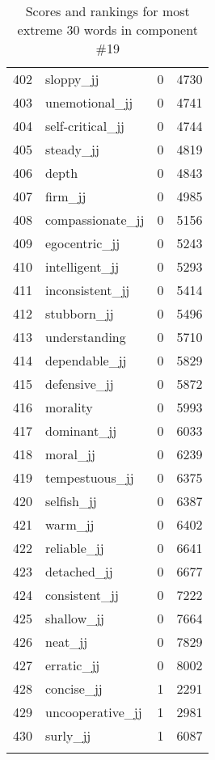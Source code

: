 \begin{longtable}[!htbp]{| rlr@{.}l |}
    402 & sloppy\_jj & 0 & 4730 \\
    403 & unemotional\_jj & 0 & 4741 \\
    404 & self-critical\_jj & 0 & 4744 \\
    405 & steady\_jj & 0 & 4819 \\
    406 & depth & 0 & 4843 \\
    407 & firm\_jj & 0 & 4985 \\
    408 & compassionate\_jj & 0 & 5156 \\
    409 & egocentric\_jj & 0 & 5243 \\
    410 & intelligent\_jj & 0 & 5293 \\
    411 & inconsistent\_jj & 0 & 5414 \\
    412 & stubborn\_jj & 0 & 5496 \\
    413 & understanding & 0 & 5710 \\
    414 & dependable\_jj & 0 & 5829 \\
    415 & defensive\_jj & 0 & 5872 \\
    416 & morality & 0 & 5993 \\
    417 & dominant\_jj & 0 & 6033 \\
    418 & moral\_jj & 0 & 6239 \\
    419 & tempestuous\_jj & 0 & 6375 \\
    420 & selfish\_jj & 0 & 6387 \\
    421 & warm\_jj & 0 & 6402 \\
    422 & reliable\_jj & 0 & 6641 \\
    423 & detached\_jj & 0 & 6677 \\
    424 & consistent\_jj & 0 & 7222 \\
    425 & shallow\_jj & 0 & 7664 \\
    426 & neat\_jj & 0 & 7829 \\
    427 & erratic\_jj & 0 & 8002 \\
    428 & concise\_jj & 1 & 2291 \\
    429 & uncooperative\_jj & 1 & 2981 \\
    430 & surly\_jj & 1 & 6087 \\
    \hline
    \caption{Scores and rankings for most extreme 30 words in component \#19} \\
\end{longtable}
